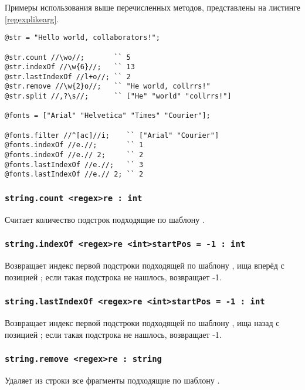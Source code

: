 \documentclass[a4paper, 14pt]{extarticle}
\begin{document}
Примеры использования выше перечисленных методов, представлены на листинге \ref{regexplikearg}.

\begin{lstlisting}[caption=Регулярные выражения в качестве аргумента, label=regexplikearg]
@str = "Hello world, collaborators!";

@str.count //\wo//;       `` 5
@str.indexOf //\w{6}//;   `` 13
@str.lastIndexOf //l+o//; `` 2
@str.remove //\w{2}o//;   `` "He world, collrrs!"
@str.split //,?\s//;      `` ["He" "world" "collrrs!"]

@fonts = ["Arial" "Helvetica" "Times" "Courier"];

@fonts.filter //^[ac]//i;    `` ["Arial" "Courier"]
@fonts.indexOf //e.//;       `` 1
@fonts.indexOf //e.// 2;     `` 2
@fonts.lastIndexOf //e.//;   `` 3
@fonts.lastIndexOf //e.// 2; `` 2
\end{lstlisting}

\subsubsection{\lstinline|string.count <regex>re : int|}

Считает количество подстрок подходящие по шаблону .

\subsubsection{\lstinline|string.indexOf <regex>re <int>startPos = -1 : int|}

Возвращает индекс первой подстроки подходящей по шаблону , ища вперёд с позицией ; если такая подстрока не нашлось, возвращает -1.

\subsubsection{\lstinline|string.lastIndexOf <regex>re <int>startPos = -1 : int|}

Возвращает индекс первой подстроки подходящей по шаблону , ища назад с позицией ; если такая подстрока не нашлось, возвращает -1.

\subsubsection{\lstinline|string.remove <regex>re : string|}

Удаляет из строки все фрагменты подходящие по шаблону .
\end{document}
